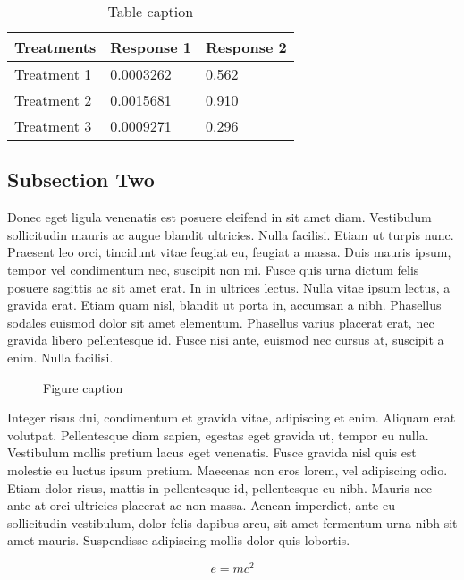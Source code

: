 \documentclass[preprint,12pt]{elsarticle}
\begin{document}
	\begin{table}[h]
		\centering
		\begin{tabular}{l l l}
			\hline
			\textbf{Treatments} & \textbf{Response 1} & \textbf{Response 2}\\
			\hline
			Treatment 1 & 0.0003262 & 0.562 \\
			Treatment 2 & 0.0015681 & 0.910 \\
			Treatment 3 & 0.0009271 & 0.296 \\
			\hline
		\end{tabular}
		\caption{Table caption}
	\end{table}

	\subsection{Subsection Two}

	Donec eget ligula venenatis est posuere eleifend in sit amet diam. Vestibulum sollicitudin mauris ac augue blandit ultricies. Nulla facilisi. Etiam ut turpis nunc. Praesent leo orci, tincidunt vitae feugiat eu, feugiat a massa. Duis mauris ipsum, tempor vel condimentum nec, suscipit non mi. Fusce quis urna dictum felis posuere sagittis ac sit amet erat. In in ultrices lectus. Nulla vitae ipsum lectus, a gravida erat. Etiam quam nisl, blandit ut porta in, accumsan a nibh. Phasellus sodales euismod dolor sit amet elementum. Phasellus varius placerat erat, nec gravida libero pellentesque id. Fusce nisi ante, euismod nec cursus at, suscipit a enim. Nulla facilisi.

	\begin{figure}[h]

		\caption{Figure caption}
	\end{figure}

	Integer risus dui, condimentum et gravida vitae, adipiscing et enim. Aliquam erat volutpat. Pellentesque diam sapien, egestas eget gravida ut, tempor eu nulla. Vestibulum mollis pretium lacus eget venenatis. Fusce gravida nisl quis est molestie eu luctus ipsum pretium. Maecenas non eros lorem, vel adipiscing odio. Etiam dolor risus, mattis in pellentesque id, pellentesque eu nibh. Mauris nec ante at orci ultricies placerat ac non massa. Aenean imperdiet, ante eu sollicitudin vestibulum, dolor felis dapibus arcu, sit amet fermentum urna nibh sit amet mauris. Suspendisse adipiscing mollis dolor quis lobortis.

	\begin{equation}
	\label{eq:emc}
	e = mc^2
	\end{equation}
\end{document}
